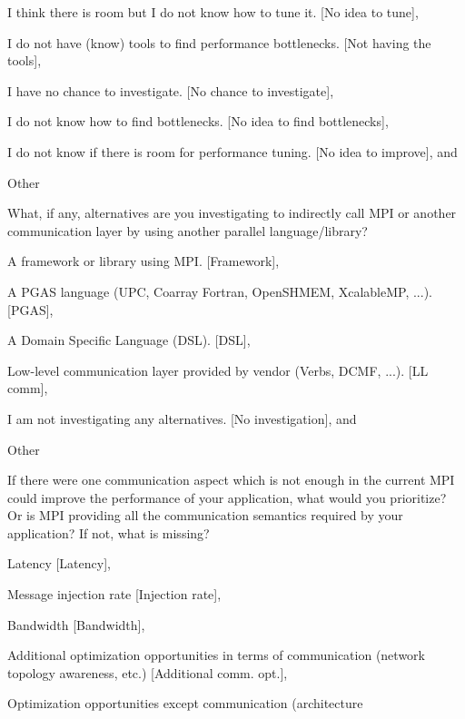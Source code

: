 \documentclass[preprint,5p,times]{elsarticle}
\begin{document}
{{\begin{description}[leftmargin=3mm]
\begin{inparaenum}[{\bf C}1)]
    \item I think there is room but I do not know how to tune it.
      [No idea to tune],
    \item I do not have (know) tools to find performance bottlenecks.
      [Not having the tools],
    \item I have no chance to investigate.
      [No chance to investigate],
    \item I do not know how to find bottlenecks.
      [No idea to find bottlenecks],
    \item I do not know if there is room for performance tuning.
      [No idea to improve], and
    \item Other
    \end{inparaenum}
  \item[Q24*:] What, if any, alternatives are you investigating to
    indirectly call MPI or another communication layer by using another
    parallel language/library?
    \begin{inparaenum}[{\bf C}1)]
    \item A framework or library using MPI. [Framework],
    \item A PGAS language (UPC, Coarray Fortran, OpenSHMEM, XcalableMP,
      ...). [PGAS],
    \item A Domain Specific Language (DSL). [DSL],
    \item Low-level communication layer provided by vendor (Verbs, DCMF,
      ...). [LL comm],
    \item I am not investigating any alternatives. [No investigation], and
    \item Other
    \end{inparaenum}
  \item[Q25:] If there were one communication aspect which is not enough
    in the current MPI could improve the performance of your application,
    what would you prioritize? Or is MPI providing all the communication
    semantics required by your application? If not, what is missing?
    \begin{inparaenum}[{\bf C}1)]
    \item Latency [Latency],
    \item Message injection rate [Injection rate],
    \item Bandwidth [Bandwidth],
    \item Additional optimization opportunities in terms of communication
      (network topology awareness, etc.) [Additional comm. opt.],
    \item Optimization opportunities except communication (architecture

\end{inparaenum}
\end{description}}}
\end{document}
